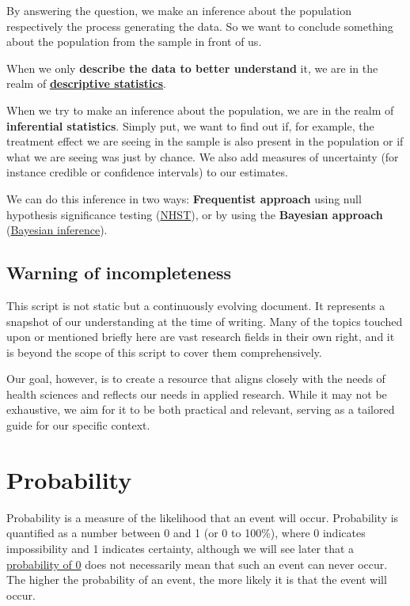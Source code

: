 \documentclass[
]{book}
\begin{document}
By answering the question, we make an inference about the population respectively the process generating
the data. So we want to conclude something about the population from the sample in front of us.

When we only \textbf{describe the data to better understand} it, we are in the realm of
\textbf{\hyperref[descriptive_stats]{descriptive statistics}}.

When we try to make an inference about the population, we are in the
realm of \textbf{inferential statistics}. Simply put, we want to find out if, for example, the treatment effect
we are seeing in the sample is also present in the population or if what we are seeing was just by chance.
We also add measures of uncertainty (for instance credible or confidence intervals) to our estimates.

We can do this inference in two ways: \textbf{Frequentist approach} using null hypothesis significance
testing (\hyperref[nhst]{NHST}), or by using the \textbf{Bayesian approach} (\hyperref[bayes_statistics]{Bayesian inference}).

\section{Warning of incompleteness}\label{warning-of-incompleteness}

This script is not static but a continuously evolving document.
It represents a snapshot of our understanding at the time of writing.
Many of the topics touched upon or mentioned briefly here are vast research fields
in their own right, and it is beyond the scope of this script to cover them comprehensively.

Our goal, however, is to create a resource that aligns closely with the needs
of health sciences and reflects our needs in applied research.
While it may not be exhaustive, we aim for it to be both practical and relevant,
serving as a tailored guide for our specific context.

\chapter{Probability}\label{probs}

Probability is a measure of the likelihood that an event will occur. Probability is quantified as a number between 0 and 1 (or 0 to 100\%),
where 0 indicates impossibility and 1 indicates certainty, although we will see later that a \href{https://stats.stackexchange.com/questions/273382/how-can-the-probability-of-each-point-be-zero-in-continuous-random-variable}{probability of 0} does not necessarily mean that such an event can never occur.
The higher the probability of an event, the more likely it is that the event will occur.
\end{document}

